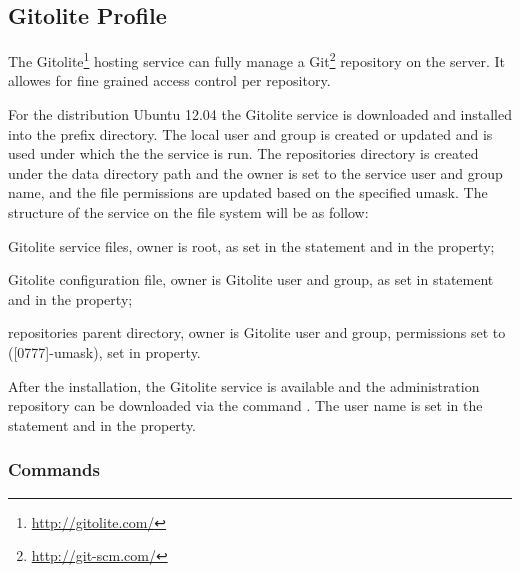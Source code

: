 \label{sec:gitolite_profile}
\subsection{Gitolite Profile}

The Gitolite\footnote{\url{http://gitolite.com/}} hosting service can fully
manage a Git\footnote{\url{http://git-scm.com/}} repository on the server.
It allowes for fine grained access control per repository.

For the distribution  Ubuntu 12.04 the Gitolite
service is downloaded and installed into the prefix directory. The local
user and group is created or updated and is used under which the the service
is run. The repositories directory is created under the data directory path
and the owner is set to the service user and group name, and the file permissions
are updated based on the specified umask. The structure of the service on the
file system will be as follow:

\begin{compactitem}
%
\item {}
Gitolite service files, owner is root, as set 
in the  statement and in 
the  property;
%
\item {}
Gitolite configuration file, owner is Gitolite user and group, as set 
in  statement and in 
the  property;
%
\item {}
repositories parent directory, owner is Gitolite user and group, permissions set 
to ([0777]-umask), set 
in  property.
\end{compactitem}

After the installation, the Gitolite service is available and the administration
repository can be downloaded via the 
command . The user name is set
in the  statement and in 
the  property.

\subsubsection{Commands}

